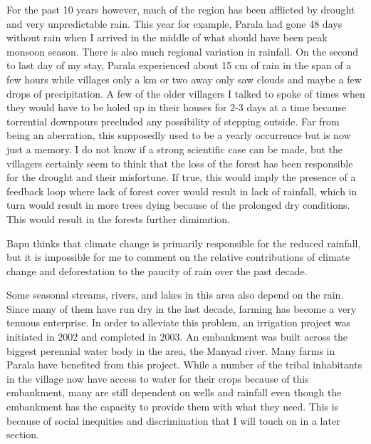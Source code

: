\documentclass{report}
\begin{document}
For the past 10 years however, much of the region has been afflicted by drought and very unpredictable rain. This year for example, Parala had gone 48 days without rain when I arrived in the middle of what should have been peak monsoon season. There is also much regional variation in rainfall. On the second to last day of my stay, Parala experienced about 15 cm of rain in the span of a few hours while villages only a km or two away only saw clouds and maybe a few drops of precipitation. A few of the older villagers I talked to spoke of times when they would have to be holed up in their houses for 2-3 days at a time because torrential downpours precluded any possibility of stepping outside. Far from being an aberration, this supposedly used to be a yearly occurrence but is now just a memory. I do not know if a strong scientific case can be made, but the villagers certainly seem to think that the loss of the forest has been responsible for the drought and their misfortune. If true, this would imply the presence of a feedback loop where lack of forest cover would result in lack of rainfall, which in turn would result in more trees dying because of the prolonged dry conditions. This would result in the forests further diminution.

Bapu thinks that climate change is primarily responsible for the reduced rainfall, but it is impossible for me to comment on the relative contributions of climate change and deforestation to the paucity of rain over the past decade.

Some seasonal streams, rivers, and lakes in this area also depend on the rain. Since many of them have run dry in the last decade, farming has become a very tenuous enterprise. In order to alleviate this problem, an irrigation project was initiated in 2002 and completed in 2003. An embankment was built across the biggest perennial water body in the area, the Manyad river. Many farms in Parala have benefited from this project. While a number of the tribal inhabitants in the village now have access to water for their crops because of this embankment, many are still dependent on wells and rainfall even though the embankment has the capacity to provide them with what they need. This is because of social inequities and discrimination that I will touch on in a later section.

\newpage



\end{document}
